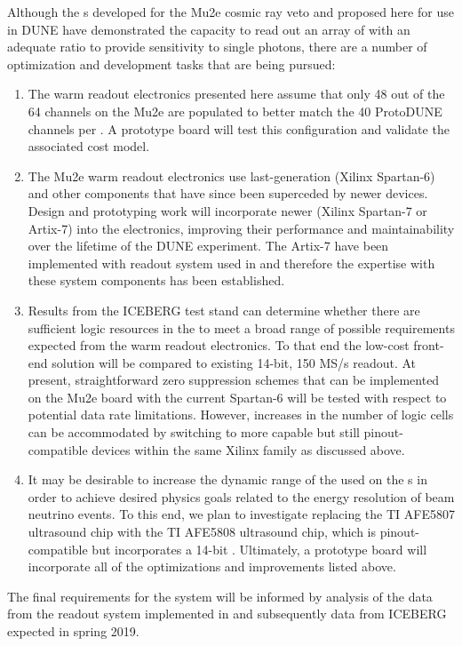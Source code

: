 Although the s developed for the Mu2e cosmic ray veto and proposed here for use in DUNE have %
demonstrated the capacity to read out an array of  with an adequate  ratio to provide sensitivity to single photons, there are a number of optimization and development tasks that are being pursued:  
\begin{enumerate}
\item The warm readout electronics presented here assume that only 48 out of the 64 channels on the Mu2e  are populated to better match the 40 ProtoDUNE channels per .  A prototype board will %
test this configuration and validate the associated cost model.  
\item The Mu2e warm readout electronics use last-generation (Xilinx\texttrademark{} Spartan-6)  and other components that have since been superceded by newer devices.  Design and prototyping work will %
incorporate newer  (Xilinx Spartan-7 or Artix-7) into the electronics, %
improving their performance and maintainability over the lifetime of the DUNE experiment. The Artix-7  have been implemented with  readout system used in  and therefore the expertise with these system components has been established. 
\item Results from the ICEBERG test stand can determine whether there are sufficient logic resources in the  to meet a broad range of possible  requirements expected from the warm readout electronics. To that end the low-cost front-end solution will be compared to existing 14-bit, 150 MS/s  readout. At present, straightforward zero suppression schemes that can be implemented on the Mu2e board with the current Spartan-6  will be tested with respect to potential  data rate limitations.  However, increases in the number of logic cells can be accommodated by switching to more capable but still pinout-compatible devices within the same Xilinx  family as discussed above.  
\item It may be desirable to increase the dynamic range of the  used on the s in order to achieve desired physics goals related to the energy resolution of beam neutrino events.  To this end, %
we plan to investigate replacing the TI AFE5807 ultrasound chip with the TI AFE5808 ultrasound chip, which is pinout-compatible but incorporates a 14-bit .  Ultimately, a prototype board will %
incorporate all of the optimizations and improvements listed above.
\end{enumerate}
The final requirements for the system will be informed by analysis of the data from the readout system implemented in  and subsequently data from ICEBERG expected in spring 2019.

